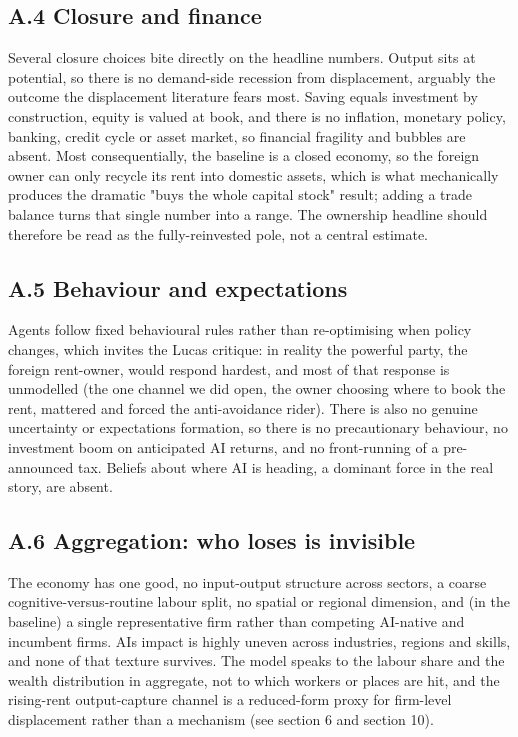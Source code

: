 \documentclass[11pt]{article}
\begin{document}
\hypertarget{a.4-closure-and-finance}{%
\subsection{A.4 Closure and finance}\label{a.4-closure-and-finance}}

Several closure choices bite directly on the headline numbers. Output
sits at potential, so there is no demand-side recession from
displacement, arguably the outcome the displacement literature fears
most. Saving equals investment by construction, equity is valued at
book, and there is no inflation, monetary policy, banking, credit cycle
or asset market, so financial fragility and bubbles are absent. Most
consequentially, the baseline is a closed economy, so the foreign owner
can only recycle its rent into domestic assets, which is what
mechanically produces the dramatic "buys the whole capital stock"
result; adding a trade balance turns that single number into a range.
The ownership headline should therefore be read as the fully-reinvested
pole, not a central estimate.

\hypertarget{a.5-behaviour-and-expectations}{%
\subsection{A.5 Behaviour and
expectations}\label{a.5-behaviour-and-expectations}}

Agents follow fixed behavioural rules rather than re-optimising when
policy changes, which invites the Lucas critique: in reality the
powerful party, the foreign rent-owner, would respond hardest, and most
of that response is unmodelled (the one channel we did open, the owner
choosing where to book the rent, mattered and forced the anti-avoidance
rider). There is also no genuine uncertainty or expectations formation,
so there is no precautionary behaviour, no investment boom on
anticipated AI returns, and no front-running of a pre-announced tax.
Beliefs about where AI is heading, a dominant force in the real story,
are absent.

\hypertarget{a.6-aggregation-who-loses-is-invisible}{%
\subsection{A.6 Aggregation: who loses is
invisible}\label{a.6-aggregation-who-loses-is-invisible}}

The economy has one good, no input-output structure across sectors, a
coarse cognitive-versus-routine labour split, no spatial or regional
dimension, and (in the baseline) a single representative firm rather
than competing AI-native and incumbent firms. AI\textquotesingle s
impact is highly uneven across industries, regions and skills, and none
of that texture survives. The model speaks to the labour share and the
wealth distribution in aggregate, not to which workers or places are
hit, and the rising-rent output-capture channel is a reduced-form proxy
for firm-level displacement rather than a mechanism (see section 6 and
section 10).
\end{document}
